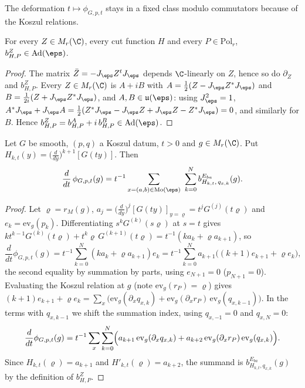 The deformation $t\mapsto\phi_{G,p,t}$ stays in a fixed class modulo commutators because of the Koszul relations.

\begin{lemma}\label{pf:multnc:adbas}
For every $Z\in M_r(\C)$, every cut function $H$ and every $P\in\mathrm{Pol}_r$, $b^Z_{H,P}\in\mathrm{Ad}(\eps)$.
\end{lemma}

\begin{proof}
The matrix $\bar Z=-J_\eps Z^tJ_\eps$ depends $\C$-linearly on $Z$, hence so do $\partial_Z$ and $b^Z_{H,P}$. Every
$Z\in M_r(\C)$ is $A+iB$ with $A=\frac12(Z-J_\eps Z^*J_\eps)$ and $B=\frac1{2i}(Z+J_\eps Z^*J_\eps)$, and $A,B\in\mathfrak
u(\eps)$: using $J_\eps^2=1$, $A^*J_\eps+J_\eps A=\frac12(Z^*J_\eps-J_\eps Z+J_\eps Z-Z^*J_\eps)=0$, and similarly for $B$.
Hence $b^Z_{H,P}=b^A_{H,P}+i\,b^B_{H,P}\in\mathrm{Ad}(\eps)$.
\end{proof}

\begin{lemma}\label{pf:multnc:famderiv}
Let $G$ be smooth, $(p,q)$ a Koszul datum, $t>0$ and $g\in M_r(\C)$. Put $H_{k,t}(y)=\bigl(\frac{d}{dy}\bigr)^{k+1}[G(ty)]$.
Then
\[
\frac{d}{dt}\,\phi_{G,p,t}(g)=t^{-1}\sum_{x=(a,b)\in\mathrm{Mo}(\eps)}\ \sum_{k=0}^{N}b^{E_{ba}}_{H_{k,t},\,q_{x,k}}(g).
\]
\end{lemma}

\begin{proof}
Let $\varrho=r_M(g)$, $a_j=\bigl(\frac{d}{dy}\bigr)^j[G(ty)]_{y=\varrho}=t^jG^{(j)}(t\varrho)$ and $e_k=\mathrm{ev}_g(p_k)$.
Differentiating $s^kG^{(k)}(s\varrho)$ at $s=t$ gives $kt^{k-1}G^{(k)}(t\varrho)+t^k\varrho\,G^{(k+1)}(t\varrho)=
t^{-1}(ka_k+\varrho a_{k+1})$, so
\[
\frac{d}{dt}\phi_{G,p,t}(g)=t^{-1}\sum_{k=0}^N(ka_k+\varrho a_{k+1})e_k=t^{-1}\sum_{k=0}^Na_{k+1}\bigl((k+1)e_{k+1}+\varrho e_k\bigr),
\]
the second equality by summation by parts, using $e_{N+1}=0$ ($p_{N+1}=0$). Evaluating the Koszul relation at $g$ (note
$\mathrm{ev}_g(r_P)=\varrho$) gives $(k+1)e_{k+1}+\varrho e_k=\sum_x\bigl(\mathrm{ev}_g(\partial_xq_{x,k})+\mathrm{ev}_g(\partial_xr_P)\,
\mathrm{ev}_g(q_{x,k-1})\bigr)$. In the terms with $q_{x,k-1}$ we shift the summation index, using $q_{x,-1}=0$ and
$q_{x,N}=0$:
\[
\frac{d}{dt}\phi_{G,p,t}(g)=t^{-1}\sum_x\sum_{k=0}^N\Bigl(a_{k+1}\,\mathrm{ev}_g(\partial_xq_{x,k})+a_{k+2}\,
\mathrm{ev}_g(\partial_xr_P)\,\mathrm{ev}_g(q_{x,k})\Bigr).
\]
Since $H_{k,t}(\varrho)=a_{k+1}$ and $H'_{k,t}(\varrho)=a_{k+2}$, the summand is $b^{E_{ba}}_{H_{k,t},q_{x,k}}(g)$ by the
definition of $b^Z_{H,P}$.
\end{proof}

